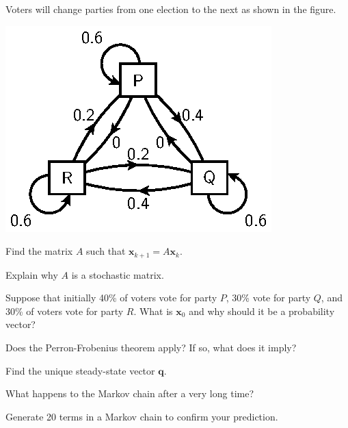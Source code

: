 \documentclass[12pt]{article}
\newcommand{\vs}[1]{\vspace{#1in}}
\newcommand{\qvec}{{\mathbf q}}
\newcommand{\xvec}{{\mathbf x}}
\begin{document}
\begin{enumerate}
  Voters will change parties from one election to the next as shown in
  the figure.

  \begin{center}
    \includegraphics{stoch-parties.eps}
  \end{center}

  \newpage
  Find the matrix $A$ such that $\xvec_{k+1}=A\xvec_k$.

  \vs{1}
  Explain why $A$ is a stochastic matrix.

  \vs{1}
  Suppose that initially 40\% of voters vote for party $P$, 30\% vote
  for party $Q$, and 30\% of voters vote for party $R$.  What is
  $\xvec_0$ and why should it be a probability vector?

  \vs{1}
  Does the Perron-Frobenius theorem apply?  If so, what does it imply?

  \vs{1}
  Find the unique steady-state vector $\qvec$.

  \vs{1}
  What happens to the Markov chain after a very long time?

  \vs{1}
  Generate 20 terms in a Markov chain to confirm your prediction.

  
  



\end{enumerate}
\end{document}

